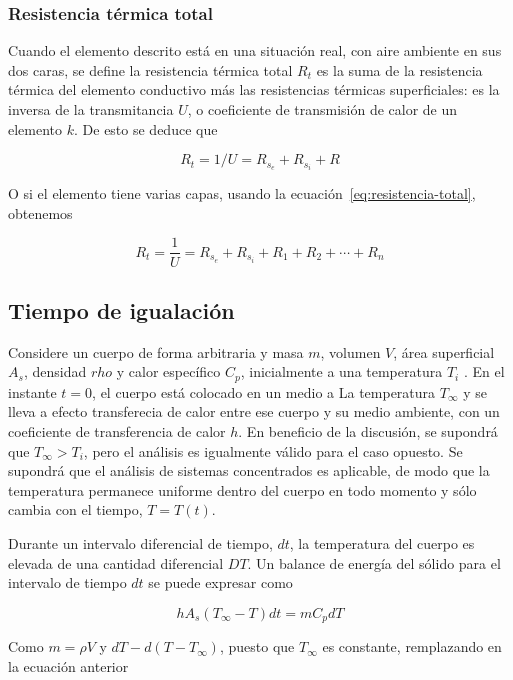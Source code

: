 \subsubsection{Resistencia térmica total}
Cuando el elemento descrito está en una situación real, 
con aire ambiente en sus dos caras, se define la resistencia
térmica total $R_t$ es la suma de la resistencia
térmica del elemento conductivo más las
resistencias térmicas superficiales: es la inversa
de la transmitancia $U$, o 
coeficiente de transmisión de calor 
de un elemento $k$. De esto se deduce que

\begin{equation}
    R_t = 1/U = R_{s_e}+ R_{s_i} + R
\end{equation}

O si el elemento tiene varias capas, usando
la ecuación~\ref{eq:resistencia-total}, obtenemos

\begin{equation}
    \label{eq:resistencia:total}
    R_t = \frac{1}{U} = R_{s_e} + R_{s_i} + R_1 + R_2 + \cdots + R_n
\end{equation}

\subsection{Tiempo de igualación}
Considere un cuerpo de forma
arbitraria y masa $m$, volumen $V$, 
área superficial $A_s$, densidad $rho$ y calor
específico $C_p$, inicialmente a una temperatura $T_i$
. En el instante $t=0$, el cuerpo está colocado en un medio a La
temperatura $T_\infty$ y se lleva a efecto 
transferecia de calor entre ese cuerpo y su medio
ambiente, con un coeficiente de transferencia de calor
$h$. En beneficio de la discusión, se supondrá que $T_\infty > T_i$,
pero el análisis es igualmente válido para el caso opuesto.
Se supondrá que el análisis de sistemas concentrados es
aplicable, de modo que la temperatura permanece uniforme dentro del
cuerpo en todo momento y sólo cambia con el tiempo, $T = T(t)$.

Durante un intervalo diferencial de tiempo, $dt$, la temperatura
del cuerpo es elevada de una cantidad diferencial $DT$. Un
balance de energía del sólido para el intervalo de tiempo $dt$
se puede expresar como

\begin{equation}
    hA_s(T_\infty -T)dt = mC_p dT
\end{equation}

Como $m = \rho V$ y $dT - d(T - T_\infty)$,
puesto que $T_\infty$ es constante, remplazando
en la ecuación anterior

